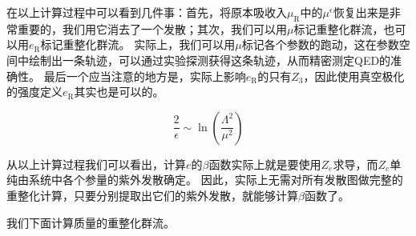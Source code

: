 在以上计算过程中可以看到几件事：首先，将原本吸收入$\mu_\text{R}$中的$\mu^\epsilon$恢复出来是非常重要的，我们用它消去了一个发散；其次，我们可以用$\mu$标记重整化群流，也可以用$e_\text{R}$标记重整化群流。
实际上，我们可以用$\mu$标记各个参数的跑动，这在参数空间中绘制出一条轨迹，可以通过实验探测获得这条轨迹，从而精密测定QED的准确性。
最后一个应当注意的地方是，实际上影响$e_\text{R}$的只有$Z_3$，因此使用真空极化的强度定义$e_\text{R}$其实也是可以的。

\begin{equation}
    \frac{2}{\epsilon} \sim \ln\left(\frac{\Lambda^2}{\mu^2}\right)
\end{equation}

从以上计算过程我们可以看出，计算$e$的$\beta$函数实际上就是要使用$Z_e$求导，而$Z_e$单纯由系统中各个参量的紫外发散确定。
因此，实际上无需对所有发散图做完整的重整化计算，只要分别提取出它们的紫外发散，就能够计算$\beta$函数了。

我们下面计算质量的重整化群流。